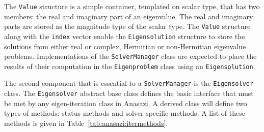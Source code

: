 \documentclass[acmtoms,acmnow]{acmtrans2m}
\newcommand{\aspace}[1]{\texttt{#1}}
\begin{document}
The \aspace{Value} structure is a simple container, templated on scalar type, that
has two members: the real and imaginary part of an eigenvalue.  The real and imaginary
parts are stored as the magnitude type of the scalar type.  The \aspace{Value} structure
along with the \verb!index! vector enable the \aspace{Eigensolution} structure to 
store the solutions from either real or complex, Hermitian or non-Hermitian eigenvalue
problems. Implementations of the \aspace{SolverManager} class are expected to place the 
results of their computation in the \aspace{Eigenproblem} class using an \aspace{Eigensolution}. 

The second component that is essential to a \aspace{SolverManager} is the \aspace{Eigensolver}
class. The \aspace{Eigensolver} abstract base class defines the basic interface that must be met
by any eigen-iteration class in Anasazi. A derived class will define two types of methods: status methods and
solver-specific methods. A list of these methods is given in Table~\ref{tab:anasazi:itermethods}.
\end{document}
